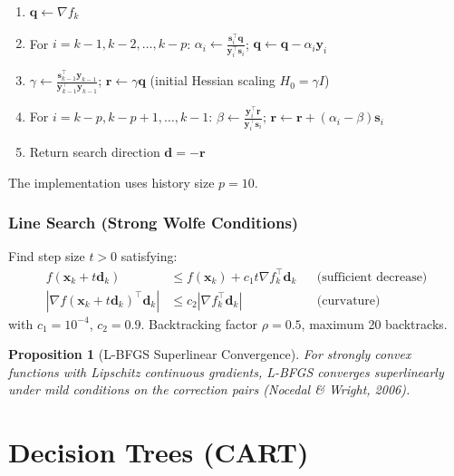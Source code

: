 \documentclass[11pt,a4paper]{article}
\newtheorem{proposition}[theorem]{Proposition}
\theoremstyle{definition}
\theoremstyle{remark}
\begin{document}
\begin{enumerate}[label=\arabic*., itemsep=0pt]
\item $\mathbf{q} \leftarrow \nabla f_k$
\item For $i = k-1, k-2, \ldots, k-p$: \quad $\alpha_i \leftarrow \frac{\mathbf{s}_i^\top\mathbf{q}}{\mathbf{y}_i^\top\mathbf{s}_i}$; \quad $\mathbf{q} \leftarrow \mathbf{q} - \alpha_i\mathbf{y}_i$
\item $\gamma \leftarrow \frac{\mathbf{s}_{k-1}^\top\mathbf{y}_{k-1}}{\mathbf{y}_{k-1}^\top\mathbf{y}_{k-1}}$; \quad $\mathbf{r} \leftarrow \gamma\mathbf{q}$ \hfill (initial Hessian scaling $H_0 = \gamma I$)
\item For $i = k-p, k-p+1, \ldots, k-1$: \quad $\beta \leftarrow \frac{\mathbf{y}_i^\top\mathbf{r}}{\mathbf{y}_i^\top\mathbf{s}_i}$; \quad $\mathbf{r} \leftarrow \mathbf{r} + (\alpha_i - \beta)\mathbf{s}_i$
\item Return search direction $\mathbf{d} = -\mathbf{r}$
\end{enumerate}

The implementation uses history size $p = 10$.

\subsubsection*{Line Search (Strong Wolfe Conditions)}

Find step size $t > 0$ satisfying:
\begin{align}
f(\mathbf{x}_k + t\mathbf{d}_k) &\leq f(\mathbf{x}_k) + c_1 t \nabla f_k^\top\mathbf{d}_k && \text{(sufficient decrease)} \\
|\nabla f(\mathbf{x}_k + t\mathbf{d}_k)^\top\mathbf{d}_k| &\leq c_2 |\nabla f_k^\top\mathbf{d}_k| && \text{(curvature)}
\end{align}
with $c_1 = 10^{-4}$, $c_2 = 0.9$. Backtracking factor $\rho = 0.5$, maximum 20 backtracks.

\begin{proposition}[L-BFGS Superlinear Convergence]
For strongly convex functions with Lipschitz continuous gradients, L-BFGS converges superlinearly under mild conditions on the correction pairs (Nocedal \& Wright, 2006).
\end{proposition}


\section{Decision Trees (CART)}
\end{document}
